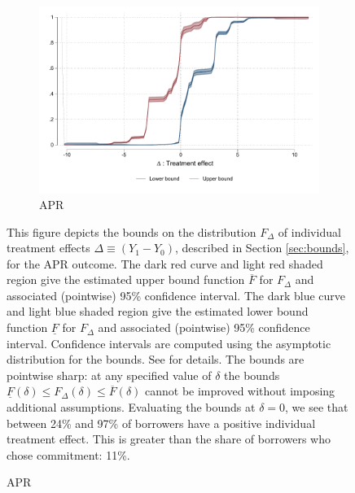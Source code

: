 \documentclass[oneside,11pt]{article}
\begin{document}
\vspace{.3in}
\begin{figure}[H]
    \caption{Fan \& Park bounds for benefit in APR\%}
    \label{fan_park_bounds}
    \begin{center}
    \begin{subfigure}{0.6\textwidth}
        \caption{APR}
        \centering
        \includegraphics[width=\textwidth]{Figuras/fan_park_bounds_apr.pdf}
    \end{subfigure}
    \end{center}
        \scriptsize
    This figure depicts the \cite{fan2010sharp} bounds on the distribution $F_\Delta$ of individual treatment effects $\Delta \equiv (Y_1 - Y_0)$, described in Section \ref{sec:bounds}, for the APR outcome.
    The dark red curve and light red shaded region give the estimated upper bound function $\overline{F}$ for $F_\Delta$ and associated (pointwise) 95\% confidence interval. 
    The dark blue curve and light blue shaded region give the estimated lower bound function $\underline{F}$ for $F_\Delta$ and associated (pointwise) 95\% confidence interval.
    Confidence intervals are computed using the asymptotic distribution for the bounds. See \cite{fan2010sharp} for details.
    The bounds are pointwise sharp: at any specified value of $\delta$ the bounds $\underline{F}(\delta) \leq F_\Delta(\delta) \leq \overline{F}(\delta)$ cannot be improved without imposing additional assumptions.
    Evaluating the bounds at $\delta = 0$, we see that between 24\% and 97\% of borrowers have a positive individual treatment effect.
    This is greater than the share of borrowers who chose commitment: 11\%.
\end{figure}
\end{document}
